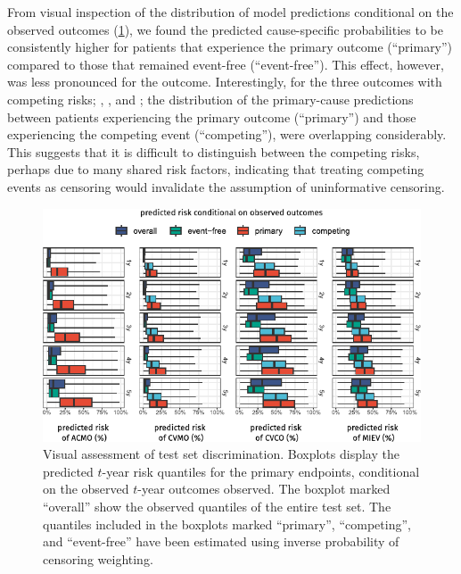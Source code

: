 From visual inspection of the distribution of model predictions 
conditional on the observed outcomes (\cref{fig:pmhnet-v2-discrimination}),
we found the predicted cause-specific probabilities to be consistently higher 
for patients that experience the primary outcome (\enquote{primary})
compared to those that remained event-free (\enquote{event-free}).
This effect, however,  was less pronounced for the  
outcome.
Interestingly, for the three outcomes with competing risks;
, , and ;
the distribution of the primary-cause predictions
between patients experiencing the primary outcome (\enquote{primary})
and those experiencing the competing event (\enquote{competing}),
were overlapping considerably.
This suggests that it is difficult to distinguish between 
the competing risks, perhaps due to many shared risk factors,
indicating that treating competing events as censoring
would invalidate the assumption of uninformative censoring.

\begin{figure}[tpb]%
    \includegraphics{graphics/pmhnet-v2-visual-discrimination.pdf}
    \caption[Test-set discrimination of ]{%
        Visual assessment of test set discrimination.  
        Boxplots display 
        the predicted \(t\)-year risk quantiles for the primary endpoints, 
        conditional on the observed \(t\)-year outcomes observed.  
        The boxplot marked \enquote{overall} show the observed 
        quantiles of the entire test set. 
        The quantiles included in the boxplots marked
        \enquote{primary}, \enquote{competing}, and \enquote{event-free}
        have been estimated using inverse probability of censoring weighting.
     }
    \label{fig:pmhnet-v2-discrimination}
\end{figure}%

